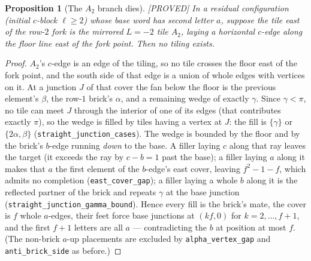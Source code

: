 \documentclass[11pt,reqno]{amsart}
\theoremstyle{plain}
\newtheorem{proposition}[theorem]{Proposition}
\theoremstyle{definition}
\newcommand{\lab}[1]{\hfill\textnormal{\footnotesize\textsc{[#1]}}}
\begin{document}
\begin{proposition}[The $A_2$ branch dies]\label{prop:a2branch}\lab{PROVED}
In a residual configuration (initial $c$-block $\ell\ge2$) whose base word has second letter $a$,
suppose the tile east of the row-$2$ fork is the mirrored $L=-2$ tile $A_2$, laying a horizontal
$c$-edge along the floor line east of the fork point. Then no tiling exists.
\end{proposition}
\begin{proof}
$A_2$'s $c$-edge is an edge of the tiling, so no tile crosses the floor east of the fork point,
and the south side of that edge is a union of whole edges with vertices on it. At a junction $J$
of that cover the fan below the floor is the previous element's $\beta$, the row-$1$ brick's
$\alpha$, and a remaining wedge of exactly $\gamma$. Since $\gamma<\pi$, no tile can meet $J$
through the interior of one of its edges (that contributes exactly $\pi$), so the wedge is filled
by tiles having a vertex at $J$: the fill is $\{\gamma\}$ or $\{2\alpha,\beta\}$
(\texttt{straight\_junction\_cases}). The wedge is bounded by the floor and by the brick's
$b$-edge running \emph{down} to the base. A filler laying $c$ along that ray leaves the target
(it exceeds the ray by $c-b=1$ past the base); a filler laying $a$ along it makes that $a$ the
first element of the $b$-edge's east cover, leaving $f^2-1-f$, which admits no completion
(\texttt{east\_cover\_gap}); a filler laying a whole $b$ along it is the reflected partner of the
brick and repeats $\gamma$ at the base junction
(\texttt{straight\_junction\_gamma\_bound}). Hence every fill is the brick's mate, the cover is
$f$ whole $a$-edges, their feet force base junctions at $(kf,0)$ for $k=2,\dots,f+1$, and the
first $f+1$ letters are all $a$ --- contradicting the $b$ at position at most $f$. (The non-brick
$a$-up placements are excluded by \texttt{alpha\_vertex\_gap} and \texttt{anti\_brick\_side} as
before.)
\end{proof}
\end{document}

